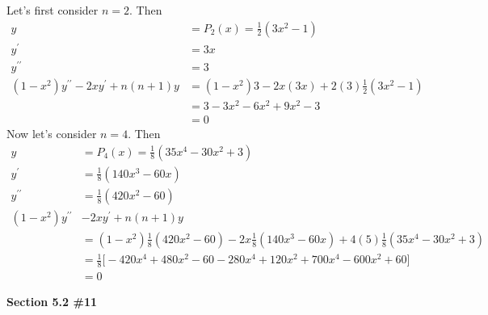 \documentclass[12pt]{article}
\newcommand{\problem}[1]{\hspace{-4 ex} \large \textbf{#1}\\}
\begin{document}
	Let's first consider $n=2$. Then 
	\begin{align*}
		y & = P_2(x) = \frac{1}{2}(3x^2-1) \\
		y^\prime & = 3x \\
		y^{\prime\prime} & = 3 \\
		(1-x^2)y^{\prime\prime} - 2xy^\prime + n(n+1)y & = (1-x^2)3 - 2x(3x) + 2(3)\frac{1}{2}(3x^2-1) \\
		& = 3-3x^2 - 6x^2 + 9x^2-3 \\
		& = 0
	\end{align*}
	Now let's consider $n=4$. Then 
	\begin{align*}
	y & = P_4(x) = \frac{1}{8}(35x^4-30x^2+3) \\
	y^\prime & = \frac{1}{8}(140x^3-60x) \\
	y^{\prime\prime} & = \frac{1}{8}(420x^2-60) \\
	(1-x^2)y^{\prime\prime} &- 2xy^\prime + n(n+1)y \\ 
	& = (1-x^2)\frac{1}{8}(420x^2-60) - 2x\frac{1}{8}(140x^3-60x) + 4(5)\frac{1}{8}(35x^4-30x^2+3) \\
	& = \frac{1}{8} \big[  -420x^4 + 480x^2 - 60 - 280x^4 + 120x^2 +700x^4 - 600x^2 + 60 \big] \\
	& = 0
	\end{align*}
	
\problem{Section 5.2 \#11} 
\end{document}
